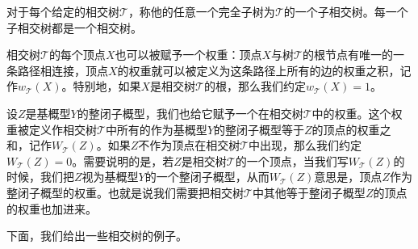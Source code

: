 对于每个给定的相交树$\mathscr T$，称他的任意一个完全子树为$\mathscr T$的一个子相交树。每一个子相交树都是一个相交树。

相交树$\mathscr T$的每个顶点$X$也可以被赋予一个权重：顶点$X$与树$\mathscr T$的根节点有唯一的一条路径相连接，顶点$X$的权重就可以被定义为这条路径上所有的边的权重之积，记作$w_{\mathscr T}(X)$。特别地，如果$X$是相交树$\mathscr T$的根，那么我们约定$w_{\mathscr T}(X)=1$。

设$Z$是基概型$Y$的整闭子概型，我们也给它赋予一个在相交树$\mathscr{T}$中的权重。这个权重被定义作相交树$\mathscr{T}$中所有的作为基概型$Y$的整闭子概型等于$Z$的顶点的权重之和，记作$W_{\mathscr{T}}(Z)$。如果$Z$不作为顶点在相交树$\mathscr{T}$中出现，那么我们约定$W_{\mathscr{T}}(Z)=0$。需要说明的是，若$Z$是相交树$\mathscr{T}$的一个顶点，当我们写$W_{\mathscr{T}}(Z)$的时候，我们把$Z$视为基概型$Y$的一个整闭子概型，从而$W_{\mathscr{T}}(Z)$意思是，顶点$Z$作为整闭子概型的权重。也就是说我们需要把相交树$\mathscr{T}$中其他等于整闭子概型$Z$的顶点的权重也加进来。

下面，我们给出一些相交树的例子。

